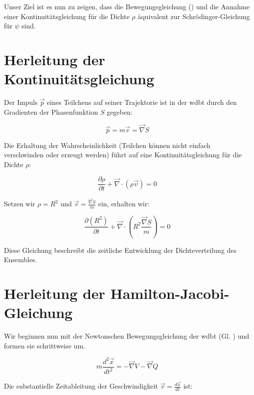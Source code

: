 Unser Ziel ist es nun zu zeigen, dass die Bewegungsgleichung () und die Annahme einer Kontinuitätsgleichung für die Dichte $\rho$ äquivalent zur
Schrödinger-Gleichung für $\psi$ sind.

\section{Herleitung der Kontinuitätsgleichung}
\label{sec:kontinuitätsgleichung}
Der Impuls $\vec{p}$ eines Teilchens auf seiner Trajektorie ist in der \gls{wdbt} durch den Gradienten der Phasenfunktion $S$ gegeben:

\begin{equation}
    \label{eq:impuls}
    \vec{p} = m \vec{v} = \vec{\nabla} S
\end{equation}

Die Erhaltung der Wahrscheinlichkeit (Teilchen können nicht einfach verschwinden oder erzeugt werden) führt auf eine Kontinuitätsgleichung für die Dichte $\rho$:

\begin{equation}
    \frac{\partial \rho}{\partial t} + \vec{\nabla} \cdot (\rho \vec{v}) = 0
\end{equation}

Setzen wir $\rho = R^2$ und $\vec{v} = \frac{\vec{\nabla} S}{m}$ ein, erhalten wir:

\begin{equation}
    \label{eq:kontinuitätsgleichung}
    \frac{\partial (R^2)}{\partial t} + \vec{\nabla} \cdot \left( R^2 \frac{\vec{\nabla} S}{m} \right) = 0
\end{equation}

Diese Gleichung beschreibt die zeitliche Entwicklung der Dichteverteilung des Ensembles.

\section{Herleitung der Hamilton-Jacobi-Gleichung}
\label{sec:hamilton_jakobi_gleichung}
Wir beginnen nun mit der Newtonschen Bewegungsgleichung der \gls{wdbt} (Gl. ) und formen sie schrittweise um.

\begin{equation}
    m \frac{d^2\vec{x}}{dt^2} = -\vec{\nabla} V - \vec{\nabla} Q \tag{3.1}
\end{equation}

Die substantielle Zeitableitung der Geschwindigkeit $\vec{v} = \frac{d \vec{x}}{dt}$ ist:

